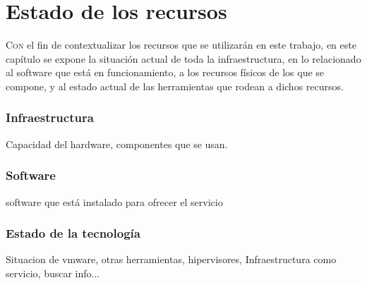 \chapter{Estado de los recursos}
\label{chap:estadoInfraestructuraSistema}
\lettrine{C}{on} el fin de contextualizar los recursos que se utilizarán en este trabajo, en este capítulo se expone la situación actual de toda la infraestructura, en lo relacionado al software que está en funcionamiento, a los recursos físicos de los que se compone, y al estado actual de las herramientas que rodean a dichos recursos.

\subsection{Infraestructura}
Capacidad del hardware, componentes que se usan.


\subsection{Software}
software que está instalado para ofrecer el servicio


\subsection{Estado de la tecnología}
Situacion de vmware, otras herramientas, hipervisores, Infraestructura como servicio, buscar info...